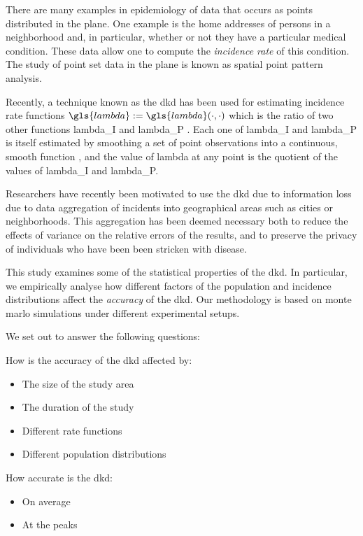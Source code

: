 


There are many examples in epidemiology of data that occurs as points distributed in the plane.
One example is
the home addresses of persons in a neighborhood and,
in particular, whether or not they have a particular medical condition.
These data allow one to compute the \textit{\gls{incidence rate}} of this condition.
The study of point set data in the plane is known as spatial point pattern analysis.

Recently, a technique known as the \gls{dkd} has been used for estimating \gls{incidence rate} functions
$\gls{lambda} := \gls{lambda}\dotdot$
which is the ratio of two other functions \gls{lambda_I} and \gls{lambda_P} \citep{portnov2009studying,kloog2009using,zusman2012residential}.
Each one of \gls{lambda_I} and \gls{lambda_P} is itself estimated by smoothing a set of point observations into a continuous,
smooth function \citep{bithell1990application},
and the value of \gls{lambda} at any point is the quotient of the values of
\gls{lambda_I} and \gls{lambda_P}.

Researchers have recently been motivated to use the \gls{dkd} due to information loss due to data aggregation of incidents into geographical areas such as cities or neighborhoods.
This aggregation has been deemed necessary both
to reduce the effects of variance on the relative errors of the results,
and to preserve the privacy of individuals who have been been stricken with disease.

This study examines some of the statistical properties of the \gls{dkd}.
In particular,
we empirically analyse how different factors of the population and incidence distributions
affect the \textit{accuracy} of the \gls{dkd}.
Our methodology is based on monte marlo simulations under different experimental setups.

We set out to answer the following questions:

\begin{hyp}
    How is the accuracy of the \gls{dkd} affected by:
    \begin{itemize}
        \item The size of the study area
        \item The duration of the study
        \item Different rate functions
        \item Different population distributions
    \end{itemize}
\end{hyp}

\begin{hyp}
    How accurate is the \gls{dkd}:
    \begin{itemize}
        \item On average
        \item At the peaks
    \end{itemize}
\end{hyp}
